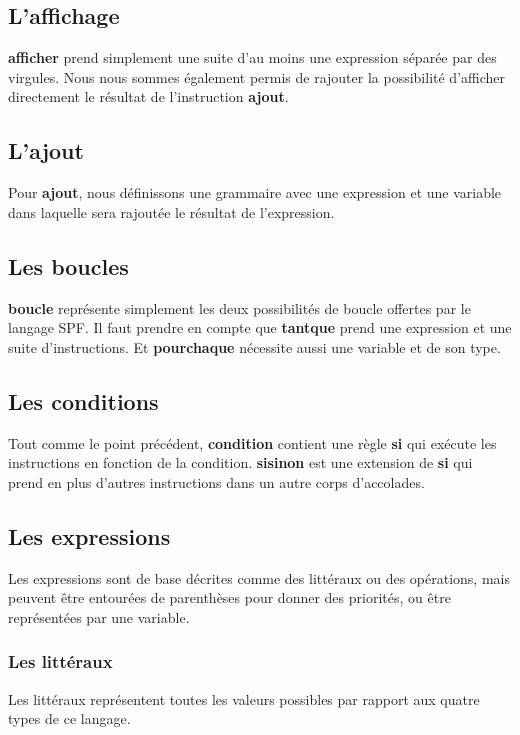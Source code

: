 \subsection{L'affichage}
\textbf{afficher} prend simplement une suite d'au moins une expression séparée par des virgules.
Nous nous sommes également permis de rajouter la possibilité d'afficher directement le résultat de l'instruction \textbf{ajout}. %

\subsection{L'ajout}
Pour \textbf{ajout}, nous définissons une grammaire avec une expression et une variable dans laquelle sera rajoutée le résultat de l'expression.

\subsection{Les boucles}
\textbf{boucle} représente simplement les deux possibilités de boucle offertes par le langage SPF.
Il faut prendre en compte que \textbf{tantque} prend une expression et une suite d'instructions. Et \textbf{pourchaque} nécessite aussi une variable et de son type.

\subsection{Les conditions}
Tout comme le point précédent, \textbf{condition} contient une règle \textbf{si} qui exécute les instructions en fonction de la condition.
\textbf{sisinon} est une extension de \textbf{si} qui prend en plus d'autres instructions dans un autre corps d'accolades.

\subsection{Les expressions}
Les expressions sont de base décrites comme des littéraux ou des opérations, mais peuvent être entourées de parenthèses pour donner des priorités, ou être représentées par une variable.

\subsubsection{Les littéraux}
Les littéraux représentent toutes les valeurs possibles par rapport aux quatre types de ce langage.

